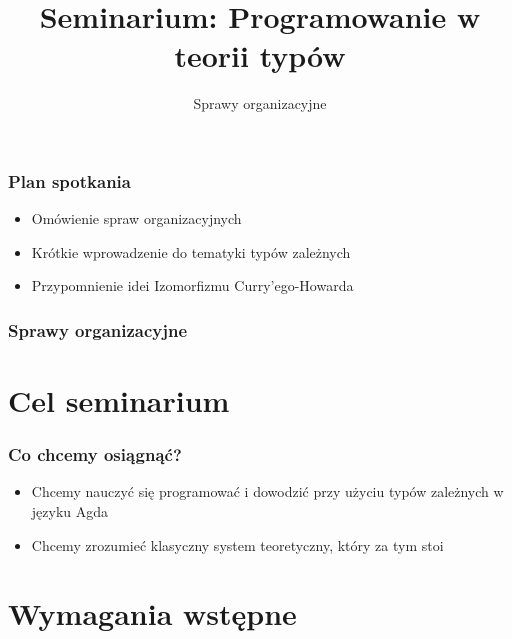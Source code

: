 \documentclass{beamer}
\title{Seminarium: Programowanie w teorii typów}
\subtitle{Sprawy organizacyjne}
\begin{document}

\maketitle


\begin{frame}
\frametitle{Plan spotkania}

\begin{itemize}

\item Omówienie spraw organizacyjnych
\item Krótkie wprowadzenie do tematyki typów zależnych
\item Przypomnienie idei Izomorfizmu Curry'ego-Howarda

\end{itemize}

\end{frame}


\begin{frame}
\frametitle{Sprawy organizacyjne}

\tableofcontents[hidesubsections]

\end{frame}


\section{Cel seminarium}

\begin{frame}

\frametitle{Co chcemy osiągnąć?}

\begin{itemize}
\item Chcemy nauczyć się programować i dowodzić przy użyciu typów zależnych w języku Agda
\item Chcemy zrozumieć klasyczny system teoretyczny, który za tym stoi
\end{itemize}

\end{frame}


\section{Wymagania wstępne}
\end{document}
